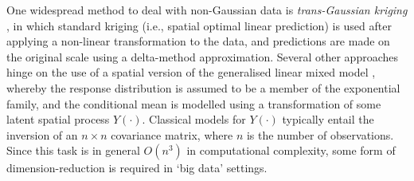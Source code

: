 \documentclass[nojss]{jss}
\begin{document}
One widespread method to deal with non-Gaussian data is \textit{trans-Gaussian kriging} \citep[pg.~137--138]{Cressie_1993_stats_for_spatial_data}, in which standard kriging (i.e., spatial optimal linear prediction) is used after applying a non-linear transformation to the data, and predictions are made on the original scale using a delta-method approximation. 
Several other approaches hinge on the use of a spatial version of the generalised linear mixed model \citep[GLMM;][]{Diggle_1998_spatial_GLMM}, whereby the response distribution is assumed to be a member of the exponential family, and the conditional mean is modelled using a transformation of some latent spatial process $Y(\cdot)$. 
 Classical %
 models for $Y(\cdot)$ typically entail the inversion of an $n\times n$ covariance matrix, where $n$ is the number of observations. 
 Since this task is in general $O(n^3)$ in computational complexity, some form of dimension-reduction is required in `big data' settings. 
 
\end{document}
